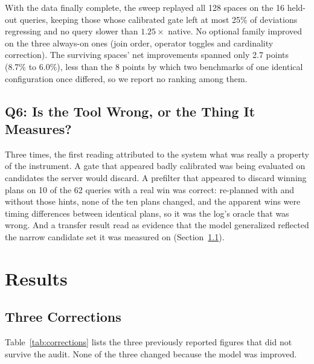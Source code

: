 \documentclass[conference]{IEEEtran}
\begin{document}
With the data finally complete, the sweep replayed all 128 spaces on the 16
held-out queries, keeping those whose calibrated gate left at most 25\% of
deviations regressing and no query slower than $1.25\times$ native. No optional
family improved on the three always-on ones (join order, operator toggles and
cardinality correction). The surviving spaces' net improvements spanned only
2.7 points (8.7\% to 6.0\%), less than the 8 points by which two benchmarks of
one identical configuration once differed, so we report no ranking among them.

\subsection{Q6: Is the Tool Wrong, or the Thing It Measures?}
\label{sec:q6}

Three times, the first reading attributed to the system what was really a
property of the instrument. A gate that appeared badly calibrated was being
evaluated on candidates the server would discard. A prefilter that appeared to
discard winning plans on 10 of the 62 queries with a real win was correct:
re-planned with and without those hints, none of the ten plans changed, and the
apparent wins were timing differences between identical plans, so it was the
log's oracle that was wrong. And a transfer result read as evidence that the
model generalized reflected the narrow candidate set it was measured on
(Section~\ref{sec:corrections}).

\section{Results}
\label{sec:results}

\subsection{Three Corrections}
\label{sec:corrections}

Table~\ref{tab:corrections} lists the three previously reported figures that did not
survive the audit. None of the three changed because the model was improved.
\end{document}
